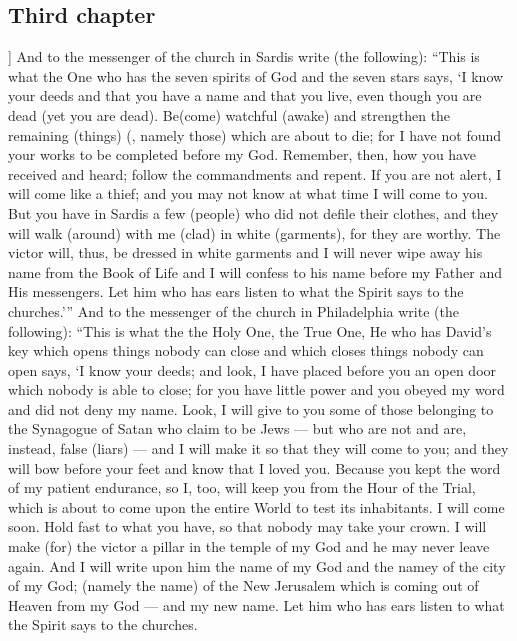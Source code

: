 \begin{pages}
\begin{Rightside}
        			\chapter*{Third chapter}
				]
		And to the messenger of the church in Sardis write (the following): “This is what the One who has the seven spirits of God and the seven stars says, ‘I know your deeds and that you have a name and that you live, even though you are dead (yet you are dead). Be(come) watchful (awake) and strengthen the remaining (things) (, namely those) which are about to die; for I have not found your works to be completed before my God. Remember, then, how you have received and heard; follow the commandments and repent. If you are not alert, I will come like a thief; and you may not know at what time I will come to you.
		\pend
		\pstart
		But you have in Sardis a few (people) who did not defile their clothes, and they will walk (around) with me (clad) in white (garments), for they are worthy. The victor will, thus, be dressed in white garments and I will never wipe away his name from the Book of Life and I will confess to his name before my Father and His messengers. Let him who has ears listen to what the Spirit says to the churches.’”
		\pend
		\pstart
		And to the messenger of the church in Philadelphia write (the following): “This is what the the Holy One, the True One, He who has David’s key which opens things nobody can close and which closes things nobody can open says, ‘I know your deeds; and look, I have placed before you an open door which nobody is able to close; for you have little power and you obeyed my word and did not deny my name. Look, I will give to you some of those belonging to the Synagogue of Satan who claim to be Jews — but who are not and are, instead, false (liars) — and I will make it so that they will come to you; and they will bow before your feet and know that I loved you. Because you kept the word of my patient endurance, so I, too, will keep you from the Hour of the Trial, which is about to come upon the entire World to test its inhabitants. I will come soon. Hold fast to what you have, so that nobody may take your crown. I will make (for) the victor a pillar in the temple of my God and he may never leave again. And I will write upon him the name of my God and the namey of the city of my God; (namely the name) of the New Jerusalem which is coming out of Heaven from my God — and my new name. Let him who has ears listen to what the Spirit says to the churches.
		\pend
		\pstart

\end{Rightside}
\end{pages}
